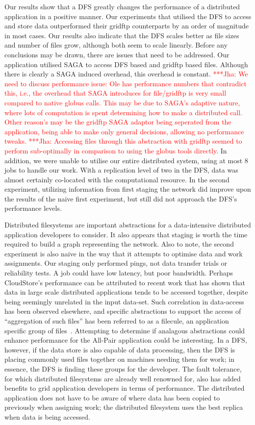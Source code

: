 \documentclass[a4paper,11pt]{article}
\newcommand{\jhanote}[1]{ {\textcolor{red} { ***Jha: #1 }}}
\newcommand{\jhanote}[1]{}
\begin{document}
Our results show that a DFS greatly changes the performance of a distributed application in a positive manner. Our experiments that utilised the DFS to access and store data outperformed their gridftp counterparts by an order of magnitude in most cases. Our results also indicate that the DFS scales better as file sizes and number of files grow, although both seem to scale linearly. Before any conclusions may be drawn, there are issues that need to be addressed. Our application utilised SAGA to access DFS based and gridftp based files. Although there is clearly a SAGA induced overhead, this overhead is constant.  \jhanote{ We need to discuss performance issue: Ole has performance numbers that contradict this, i.e., the overhead that SAGA introduces for file/gridftp is very small compared to native globus calls. This may be due to SAGA's adaptive nature, where lots of computation is spent determining how to make a distributed call. Other reason's may be the gridftp SAGA adaptor being seperated from the application, being able to make only general decisions, allowing no performance tweaks. } \jhanote{Accessing files through this abstraction with gridftp seemed to perform sub-optimally in comparison to using the globus tools directly.} In addition, we were unable to utilise our entire distributed system, using at most 8 jobs to handle our work. With a replication level of two in the DFS, data was almost certainly co-located with the computational resource. In the second experiment, utilizing information from first staging the network did improve upon the results of the naive first experiment, but still did not approach the DFS's performance levels.

Distributed filesystems are important abstractions for a data-intensive distributed application developers to consider. It also appears that staging is worth the time required to build a graph representing the network. Also to note, the second experiment is also naive in the way that it attempts to optimise data and work assignments. Our staging only performed pings, not data transfer trials or reliability tests. A job could have low latency, but poor bandwidth. Perhaps CloudStore's performance can be attributed to recent work that has shown that data in large scale distributed applications tends to be accessed together, despite being seemingly unrelated in the input data-set. Such correlation in data-access
has been observed elsewhere, and specific abstractions to support the
access of ``aggregation of such files'' has been referred to as a filecule, an application specific group of files~\cite{filecule}. Attempting to determine 
if analagous abstractions could enhance performance for the All-Pair application could be interesting.  In a DFS, however, if the data store is also capable of data processing, then the DFS is placing commonly used files together on machines needing them for work; in essence, the DFS is finding these groups for the developer. The fault tolerance, for which distributed filesystems are already well renowned for, also has added benefits to grid application developers in terms of performance. The distributed application does not have to be aware of where data has been copied to previously when assigning work; the distributed filesystem uses the best replica when data is being accessed.
\end{document}

